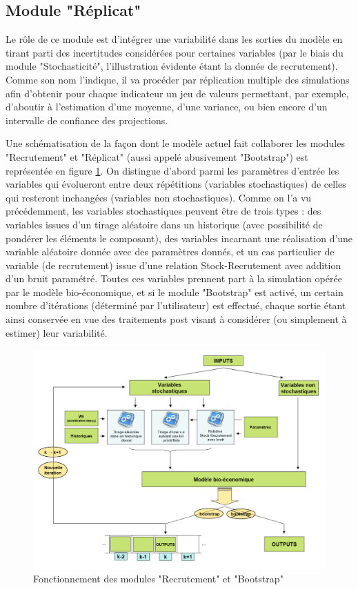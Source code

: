 \documentclass[12pt, colorinlistoftodos, notitlepage]{report}
\newenvironment{not used}[1]{%
    \longtable{%
        |>{\centering$\displaystyle}A{#1}{1}<{$}%
        |}\hline\ignorespaces}{%
    \endlongtable\ignorespacesafterend}
\begin{document}
\subsection{Module "Réplicat"}

Le rôle de ce module est d'intégrer une variabilité dans les sorties du modèle en tirant parti des incertitudes considérées pour certaines variables (par le biais du module "Stochasticité", l'illustration évidente étant la donnée de recrutement). Comme son nom l'indique, il va procéder par réplication multiple des simulations afin d'obtenir pour chaque indicateur un jeu de valeurs permettant, par exemple, d'aboutir à l'estimation d'une moyenne, d'une variance, ou bien encore d'un intervalle de confiance des projections.

Une schématisation de la façon dont le modèle actuel fait collaborer les modules "Recrutement" et "Réplicat" (aussi appelé abusivement "Bootstrap") est représentée en figure \ref{fig:recru_mod}. On distingue d'abord parmi les paramètres d'entrée les variables qui évolueront entre deux répétitions (variables stochastiques) de celles qui resteront inchangées (variables non stochastiques). Comme on l'a vu précédemment, les variables stochastiques peuvent être de trois types : des variables issues d'un tirage aléatoire dans un historique (avec possibilité de pondérer les éléments le composant), des variables incarnant une réalisation d'une variable aléatoire donnée avec des paramètres donnés, et un cas particulier de variable (de recrutement) issue d'une relation Stock-Recrutement avec addition d'un bruit paramétré. Toutes ces variables prennent part à la simulation opérée par le modèle bio-économique, et si le module "Bootstrap" est activé, un certain nombre d'itérations (déterminé par l'utilisateur) est effectué, chaque sortie étant ainsi conservée en vue des traitements post visant à considérer (ou simplement à estimer) leur variabilité.

\begin{figure}
\begin{center}
\includegraphics[width = 17cm]{figures/Recru_module.png}
\end{center}
\caption{Fonctionnement des modules "Recrutement" et "Bootstrap"}
\label{fig:recru_mod}
\end{figure}
\end{document}
